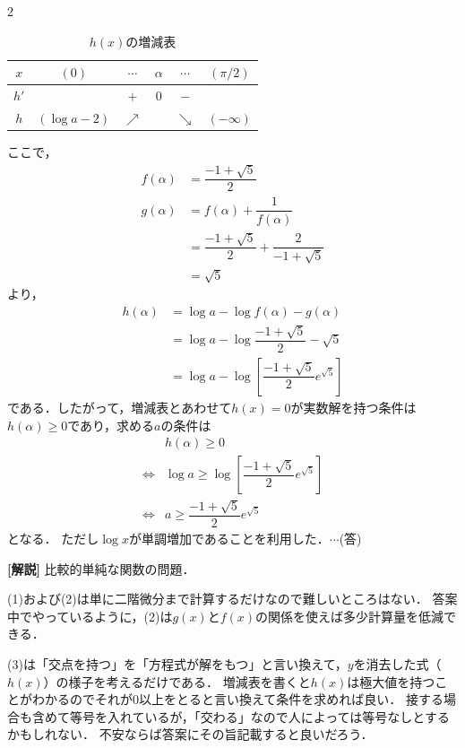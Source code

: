 \documentclass[../../main.tex]{subfiles}
\begin{document}
\begin{multicols}{2}
  \begin{table}[H]
    \centering
    \caption{$h(x)$の増減表}
    \label{2007-2:table:1}
    \begin{tabular}{|c||c|c|c|c|c|}
      \hline
      $x$  & $(0)$        & $\cdots$   & $\alpha$ & $\cdots$   & $(\pi/2)$   \\
      \hline
      $h'$ &              & $+$        & $0$      & $-$        &             \\
      \hline
      $h$  & $(\log a-2)$ & $\nearrow$ &          & $\searrow$ & $(-\infty)$ \\
      \hline
    \end{tabular}
  \end{table}
  ここで，
  \begin{align}
    f(\alpha)
    & = \dfrac{-1+\sqrt{5}}{2}                         \\
    g(\alpha)
    & = f(\alpha) + \dfrac{1}{f(\alpha)}               \\
    & = \dfrac{-1+\sqrt{5}}{2} + \dfrac{2}{-1+\sqrt{5}} \\
    & = \sqrt{5}
  \end{align}
  より，
  \begin{align}
    h(\alpha)
    & = \log a - \log f(\alpha) - g(\alpha)                           \\
    & = \log a - \log \dfrac{-1+\sqrt{5}}{2} - \sqrt{5}                \\
    & = \log a - \log \left[\dfrac{-1+\sqrt{5}}{2} e^{\sqrt{5}}\right]
  \end{align}
  である．したがって，増減表とあわせて$h(x)=0$が実数解を持つ条件は
  $h(\alpha)\ge 0$であり，求める$a$の条件は
  \begin{align}
    & h(\alpha) \ge 0                                                 \\
    \iff
    & \log a \ge \log \left[\dfrac{-1+\sqrt{5}}{2} e^{\sqrt{5}}\right] \\
    \iff
    & a \ge \dfrac{-1+\sqrt{5}}{2} e^{\sqrt{5}}
  \end{align}
  となる．
  ただし$\log x$が単調増加であることを利用した．$\cdots$(答)

  {\bf [解説]}
  比較的単純な関数の問題．

  (1)および(2)は単に二階微分まで計算するだけなので難しいところはない．
  答案中でやっているように，(2)は$g(x)$と$f(x)$の関係を使えば多少計算量を低減できる．

  (3)は「交点を持つ」を「方程式が解をもつ」と言い換えて，$y$を消去した式（$h(x)$）の様子を考えるだけである．
  増減表を書くと$h(x)$は極大値を持つことがわかるのでそれが$0$以上をとると言い換えて条件を求めれば良い．
  接する場合も含めて等号を入れているが，「交わる」なので人によっては等号なしとするかもしれない．
  不安ならば答案にその旨記載すると良いだろう．

  \newpage
\end{multicols}
\end{document}
